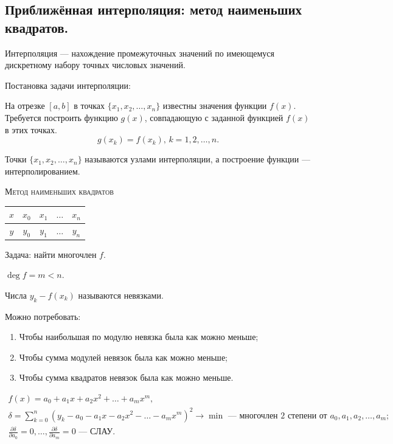 \subsection{Приближённая интерполяция: метод наименьших квадратов.}

Интерполяция --- нахождение промежуточных значений по имеющемуся дискретному набору точных числовых значений. 

Постановка задачи интерполяции:

На отрезке $[a, b]$ в точках $\{x_1, x_2, \dotsc, x_n\}$ известны значения функции $f(x)$. Требуется построить функцию $g(x)$, совпадающую с заданной функцией $f(x)$ в этих точках.
\begin{equation*}
	g(x_k) = f(x_k), \, k = 1, 2, \dotsc, n.
\end{equation*}

Точки $\{x_1, x_2, \dotsc, x_n\}$ называются узлами интерполяции, а построение функции --- интерполированием. 

\textsc{Метод наименьших квадратов}

\begin{table}[H]
	\centering
	\begin{tabular}{|c|c|c|c|c|}
		\hline
		{$x$} & {$x_0$} & {$x_1$} & {$\dotsc$} & {$x_n$} \\ \hline 
		{$y$} & {$y_0$} & {$y_1$} & {$\dotsc$} & {$y_n$} \\ \hline 
	\end{tabular}
\end{table}

Задача: найти многочлен $f$.

$\deg{f} = m < n$.

Числа $y_k - f(x_k)$ называются невязками. 

Можно потребовать:
\begin{enumerate}
	\item Чтобы наибольшая по модулю невязка была как можно меньше;
	
	\item Чтобы сумма модулей невязок была как можно меньше;
	
	\item Чтобы сумма квадратов невязок была как можно меньше.
\end{enumerate}
\begin{gather*}
	f(x) = a_0 + a_1 x + a_2 x^2 + \dotsc + a_m x^m, \\
	\delta = \sum\limits_{k = 0}^{n}(y_{k} - a_0 - a_1 x - a_2 x^2 - \dotsc - a_m x^m)^2 \to \min \text{ --- многочлен 2 степени от } a_0, a_1, a_2, \dotsc, a_m; \\
	\frac{\partial \delta}{\partial a_0} = 0, \dotsc, \frac{\partial \delta}{\partial a_m} = 0 \text{ --- СЛАУ}.
\end{gather*}

